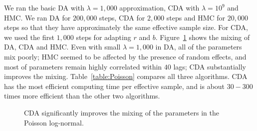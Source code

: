 \documentclass[12pt]{article}
\begin{document}
We ran the basic DA with $\lambda=1,000$ approximation, CDA with $\lambda=10^9$ and HMC. We ran DA for $200,000$ steps, CDA for $2,000$ steps and HMC for $20,000$ steps so that they have approximately the same effective sample size. For CDA, we used the first $1,000$ steps for adapting $r$ and $b$. Figure~\ref{data_poisson} shows the mixing of DA, CDA and HMC. Even with small $\lambda = 1,000$ in DA, all of the parameters mix poorly; HMC seemed to be affected by the presence of random effects, and most of parameters remain highly correlated within $40$ lags; CDA substantially improves the mixing. Table~\ref{table:Poisson} compares all three algorithms. CDA has the most efficient computing time per effective sample, and is about $30-300$ times more efficient than the other two algorithms.

\begin{figure}[H]
  {\caption{CDA significantly improves the mixing of the parameters in the Poisson log-normal. \label{data_poisson}}}
  {%
  }
\end{figure}
 
\end{document}
